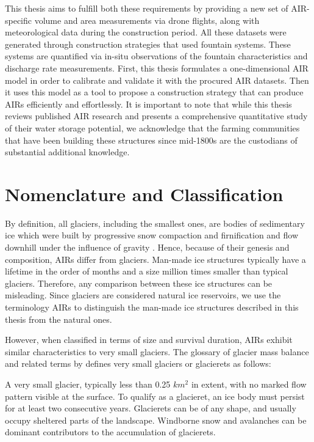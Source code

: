 This thesis aims to fulfill both these requirements by providing a new set of AIR-specific volume and area
measurements via drone flights, along with meteorological data during the construction period. All these
datasets were generated through construction strategies that used fountain systems. These systems are quantified via in-situ
observations of the fountain characteristics and discharge rate measurements. First, this thesis
formulates a one-dimensional AIR model in order to calibrate and validate it with the procured AIR datasets.
Then it uses this model as a tool to propose a construction strategy that can produce \ac{AIRs}
efficiently and effortlessly. It is important to note that while this thesis reviews published AIR research and
presents a comprehensive quantitative study of their water storage potential, we acknowledge that the farming
communities that have been building these structures since mid-1800s are the custodians of substantial additional knowledge.


\section{Nomenclature and Classification}

By definition, all glaciers, including the smallest ones, are bodies of sedimentary ice which were built
by progressive snow compaction and firnification and flow downhill under the influence of gravity
\citep{benndouglasGlaciersGlaciation2014}. Hence, because of their genesis and composition, \ac{AIRs} differ
from glaciers. Man-made ice structures typically have a lifetime in the order of months and a size million times
smaller than typical glaciers. Therefore, any comparison between these ice structures can be misleading. Since
glaciers are considered natural ice reservoirs, we use the terminology \ac{AIRs} to distinguish the man-made
ice structures described in this thesis from the natural ones. 

However, when classified in terms of size and survival duration, \ac{AIRs} exhibit similar characteristics to
very small glaciers. The glossary of glacier mass balance and related terms by
\citet{cogleyGlossaryGlacierMass2010} defines very small glaciers or glacierets as follows:

\begin{thesis_quotation}
  A very small glacier, typically less than 0.25 $km^2$ in extent, with no marked flow pattern
  visible at the surface. To qualify as a glacieret, an ice body must persist for at least two consecutive
  years. Glacierets can be of any shape, and usually occupy sheltered parts of the landscape. Windborne snow and
  avalanches can be dominant contributors to the accumulation of glacierets.
\end{thesis_quotation}

